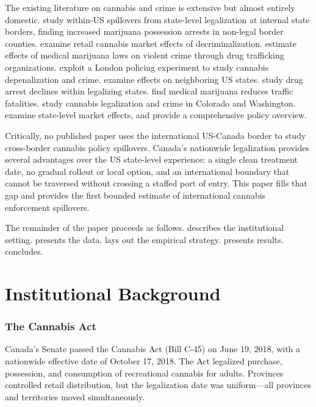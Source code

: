 \documentclass[12pt]{article}
\begin{document}
The existing literature on cannabis and crime is extensive but almost entirely domestic. \citet{hansen2020} study within-US spillovers from state-level legalization at internal state borders, finding increased marijuana possession arrests in non-legal border counties. \citet{dragone2019} examine retail cannabis market effects of decriminalization. \citet{gavrilova2019} estimate effects of medical marijuana laws on violent crime through drug trafficking organizations. \citet{adda2014} exploit a London policing experiment to study cannabis depenalization and crime. \citet{masera2023} examine effects on neighboring US states. \citet{deangelo2023} study drug arrest declines within legalizing states. \citet{anderson2013} find medical marijuana reduces traffic fatalities. \citet{brinkman2017} study cannabis legalization and crime in Colorado and Washington. \citet{hao2020} examine state-level market effects, and \citet{dills2021} provide a comprehensive policy overview.

Critically, no published paper uses the international US-Canada border to study cross-border cannabis policy spillovers. Canada's nationwide legalization provides several advantages over the US state-level experience: a single clean treatment date, no gradual rollout or local option, and an international boundary that cannot be traversed without crossing a staffed port of entry. This paper fills that gap and provides the first bounded estimate of international cannabis enforcement spillovers.

The remainder of the paper proceeds as follows.  describes the institutional setting.  presents the data.  lays out the empirical strategy.  presents results.  concludes.


\section{Institutional Background}
\label{sec:background}

\subsubsection*{The Cannabis Act} Canada's Senate passed the Cannabis Act (Bill C-45) on June 19, 2018, with a nationwide effective date of October 17, 2018. The Act legalized purchase, possession, and consumption of recreational cannabis for adults. Provinces controlled retail distribution, but the legalization date was uniform---all provinces and territories moved simultaneously.
\end{document}
